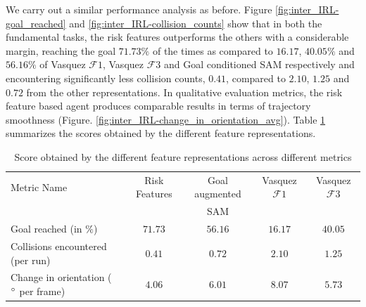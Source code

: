 
We carry out a similar performance analysis as before. Figure \ref{fig:inter_IRL-goal_reached} and \ref{fig:inter_IRL-collision_counts} show that in both the fundamental tasks, the risk features outperforms the others with a considerable margin, reaching the goal $71.73\%$ of the times as compared to $16.17$, $40.05\%$ and $56.16\%$ of Vasquez $\mathcal{F}1$, Vasquez $\mathcal{F}3$ and Goal conditioned SAM respectively and encountering significantly less collision counts, $0.41$, compared to $2.10$, $1.25$ and $0.72$ from the other  representations. In qualitative evaluation metrics, the risk feature based agent produces comparable results in terms of trajectory smoothness (Figure. \ref{fig:inter_IRL-change_in_orientation_avg}). %
Table \ref{tab:inter_irl_numerical_comparison} summarizes the scores obtained by the different feature representations.
\begin{table}[htbp]
	\begin{center}
		\renewcommand{\arraystretch}{1.5}
		\begin{tabular}{|p{2.5cm}|c|c|c|c|}
			\hline
			Metric Name & Risk Features & Goal augmented  & Vasquez $\mathcal{F}1$ & Vasquez $\mathcal{F}3$\\
			  &   & SAM  &  &  \\
			\hline
			Goal reached (in $\%$) & $71.73$ & $56.16$ & $16.17$ & $40.05$ \\
			Collisions encountered (per run) & $0.41$ & $0.72$ & $2.10$ & $1.25$\\
			Change in orientation ( $\degree$ per frame) & $4.06$ & $6.01$ &  $8.07$ & $ 5.73$\\
			\hline
		\end{tabular}
	\end{center}
	\caption{Score obtained by the different feature representations across different metrics}
	\label{tab:inter_irl_numerical_comparison}
\end{table}\\

